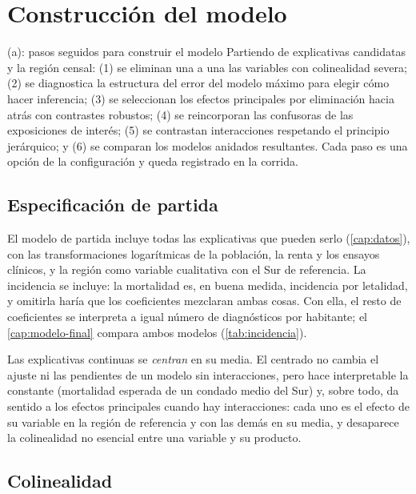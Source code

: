 \chapter{Construcción del modelo}\label{cap:construccion}

\begin{entregable}{(a): pasos seguidos para construir el modelo}
Partiendo de  explicativas candidatas y la región censal: (1) se eliminan una a
una las variables con colinealidad severa; (2) se diagnostica la estructura del error del modelo
máximo para elegir cómo hacer inferencia; (3) se seleccionan los efectos principales por
eliminación hacia atrás con contrastes robustos; (4) se reincorporan las confusoras de las
exposiciones de interés; (5) se contrastan interacciones respetando el principio jerárquico; y
(6) se comparan los modelos anidados resultantes. Cada paso es una opción de la configuración y
queda registrado en la corrida.
\end{entregable}

\section{Especificación de partida}

El modelo de partida incluye todas las explicativas que pueden serlo (\cref{cap:datos}), con las
transformaciones logarítmicas de la población, la renta y los ensayos clínicos, y la región como
variable cualitativa con el Sur de referencia. La incidencia se incluye: la mortalidad es, en
buena medida, incidencia por letalidad, y omitirla haría que los coeficientes mezclaran ambas
cosas. Con ella, el resto de coeficientes se interpreta a igual número de diagnósticos por
habitante; el \cref{cap:modelo-final} compara ambos modelos (\cref{tab:incidencia}).

Las explicativas continuas se \emph{centran} en su media. El centrado no cambia el ajuste ni las
pendientes de un modelo sin interacciones, pero hace interpretable la constante (mortalidad
esperada de un condado medio del Sur) y, sobre todo, da sentido a los efectos principales cuando
hay interacciones: cada uno es el efecto de su variable en la región de referencia y con las demás
en su media, y desaparece la colinealidad no esencial entre una variable y su producto.

\section{Colinealidad}\label{sec:colinealidad}

